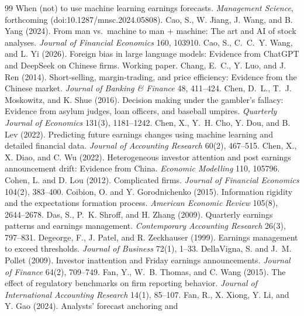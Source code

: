 \documentclass[10pt]{article}
\begin{document}
\begin{thebibliography}{99}
When (not) to use machine learning earnings forecasts. \emph{Management Science}, forthcoming
(doi:10.1287/mnsc.2024.05808).
 Cao, S., W. Jiang, J. Wang, and B. Yang (2024). From man vs.\ machine to man +
machine: The art and AI of stock analyses. \emph{Journal of Financial Economics} 160, 103910.
 Cao, S., C.~C.~Y. Wang, and L. Yi (2026). Foreign bias in large language
models: Evidence from ChatGPT and DeepSeek on Chinese firms. Working paper.
 Chang, E.~C., Y. Luo, and J. Ren (2014). Short-selling, margin-trading, and
price efficiency: Evidence from the Chinese market. \emph{Journal of Banking \& Finance} 48, 411--424.
 Chen, D.~L., T.~J. Moskowitz, and K. Shue (2016). Decision making under the
gambler's fallacy: Evidence from asylum judges, loan officers, and baseball umpires. \emph{Quarterly Journal of
Economics} 131(3), 1181--1242.
 Chen, X., Y.~H. Cho, Y. Dou, and B. Lev (2022). Predicting future earnings
changes using machine learning and detailed financial data. \emph{Journal of Accounting Research} 60(2), 467--515.
 Chen, X., X. Diao, and C. Wu (2022). Heterogeneous investor attention and
post earnings announcement drift: Evidence from China. \emph{Economic Modelling} 110, 105796.
 Cohen, L. and D. Lou (2012). Complicated firms. \emph{Journal of Financial
Economics} 104(2), 383--400.
 Coibion, O. and Y. Gorodnichenko (2015). Information rigidity
and the expectations formation process. \emph{American Economic Review} 105(8), 2644--2678.
 Das, S., P.~K. Shroff, and H. Zhang (2009). Quarterly earnings patterns and
earnings management. \emph{Contemporary Accounting Research} 26(3), 797--831.
 Degeorge, F., J. Patel, and R. Zeckhauser (1999). Earnings management
to exceed thresholds. \emph{Journal of Business} 72(1), 1--33.
 DellaVigna, S. and J.~M. Pollet (2009). Investor inattention and
Friday earnings announcements. \emph{Journal of Finance} 64(2), 709--749.
 Fan, Y., W.~B. Thomas, and C. Wang (2015). The effect of regulatory benchmarks on
firm reporting behavior. \emph{Journal of International Accounting Research} 14(1), 85--107.
 Fan, R., X. Xiong, Y. Li, and Y. Gao (2024). Analysts' forecast anchoring and

\end{thebibliography}
\end{document}
